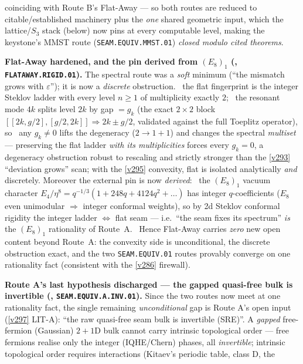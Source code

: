 \documentclass[11pt,a4paper]{article}
\begin{document}
\begin{keybox}
coinciding with Route B's Flat-Away --- so both routes are reduced to citable/established machinery plus the
\emph{one} shared geometric input, which the lattice/$S_3$ stack (below) now pins at every computable level,
making the keystone's MMST route (\texttt{SEAM.EQUIV.MMST.01}) \emph{closed modulo cited theorems}.
\par\smallskip\noindent\textbf{Flat-Away hardened, and the pin derived from $(E_8)_1$
(, \texttt{FLATAWAY.RIGID.01}).} The spectral route was a \emph{soft} minimum
(``the mismatch grows with $\varepsilon$''); it is now a \emph{discrete} obstruction. \mE\ the flat fingerprint
is the integer Steklov ladder with every level $n\ge1$ of multiplicity exactly $2$; \mE\ the resonant mode $4k$
splits level $2k$ by gap $=g_k$ (the exact $2\times2$ block $[[2k,g/2],[g/2,2k]]\Rightarrow 2k\pm g/2$, validated
against the full Toeplitz operator), so \mE\ any $g_k\ne0$ lifts the degeneracy ($2\to1{+}1$) and changes the
spectral \emph{multiset} --- preserving the flat ladder \emph{with its multiplicities} forces every $g_k=0$, a
degeneracy obstruction robust to rescaling and strictly stronger than the \vref{v293} ``deviation grows'' scan;
with the \vref{v295} convexity, flat is isolated analytically \emph{and} discretely. Moreover the external pin is
now \emph{derived}: \mC\ the $(E_8)_1$ vacuum character $E_4/\eta^8=q^{-1/3}(1+248q+4124q^2+\dots)$ has integer
$q$-coefficients ($E_8$ even unimodular $\Rightarrow$ integer conformal weights), so by 2d Steklov conformal
rigidity the integer ladder $\Leftrightarrow$ flat seam --- i.e.\ ``the seam fixes its spectrum'' \emph{is} the
$(E_8)_1$ rationality of Route~A. \mO\ Hence Flat-Away carries \emph{zero} new open content beyond Route~A: the
convexity side is unconditional, the discrete obstruction exact, and the two \texttt{SEAM.EQUIV.01} routes
provably converge on one rationality fact (consistent with the \vref{v286} firewall).
\par\smallskip\noindent\textbf{Route A's last hypothesis discharged --- the gapped quasi-free bulk is
invertible (, \texttt{SEAM.EQUIV.A.INV.01}).} Since the two routes now meet
at one rationality fact, the single remaining \emph{unconditional} gap is Route A's open input (\vref{v297}
LIT-A): ``the raw quasi-free seam bulk is invertible (SRE)''. A \emph{gapped} free-fermion (Gaussian) $2{+}1$D
bulk cannot carry intrinsic topological order --- free fermions realise only the integer (IQHE/Chern) phases,
all \emph{invertible}; intrinsic topological order requires interactions (Kitaev's periodic table, class D, the

\end{keybox}
\end{document}
